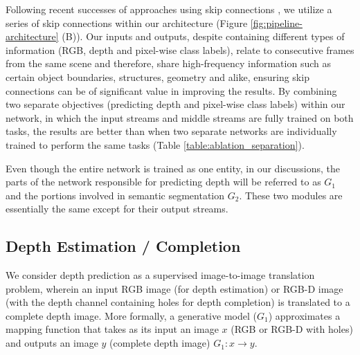 \documentclass[10pt,twocolumn,letterpaper]{article}
\begin{document}
Following recent successes of approaches using skip connections \cite{orhan2017skip, ronneberger2015u, tong2017image, yamanaka2017fast}, we utilize a series of skip connections within our architecture (Figure \ref{fig:pipeline-architecture} (B)). Our inputs and outputs, despite containing different types of information (RGB, depth and pixel-wise class labels), relate to consecutive frames from the same scene and therefore, share high-frequency information such as certain object boundaries, structures, geometry and alike, ensuring skip connections can be of significant value in improving the results. By combining two separate objectives (predicting depth and pixel-wise class labels) within our network, in which the input streams and middle streams are fully trained on both tasks, the results are better than when two separate networks are individually trained to perform the same tasks (Table \ref{table:ablation_separation}).

Even though the entire network is trained as one entity, in our discussions, the parts of the network responsible for predicting depth will be referred to as $G_1$ and the portions involved in semantic segmentation $G_2$. These two modules are essentially the same except for their output streams.\vspace{-0.1cm}

\subsection{Depth Estimation / Completion}
\label{ssec:depth_approach}\vspace{-0.1cm}

We consider depth prediction as a supervised image-to-image translation problem, wherein an input RGB image (for depth estimation) or RGB-D image (with the depth channel containing holes for depth completion) is translated to a complete depth image. More formally, a generative model ($G_1$) approximates a mapping function that takes as its input an image $x$ (RGB or RGB-D with holes) and outputs an image $y$ (complete depth image) $G_1 : x \rightarrow y$.
\end{document}
